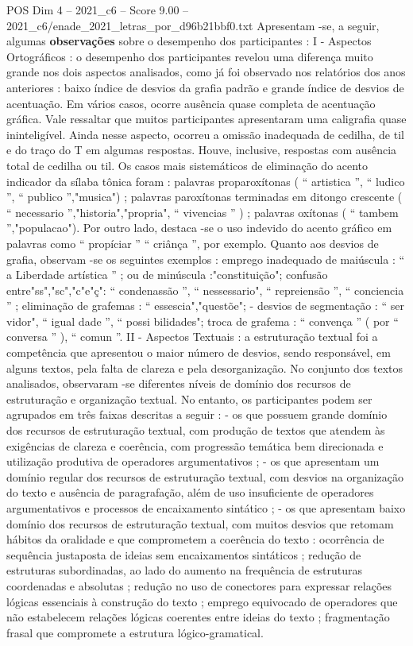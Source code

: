 \begin{textsample}{POS Dim 4 – 2021\_c6 – Score 9.00 – 2021\_c6/enade\_2021\_letras\_por\_d96b21bbf0.txt}
Apresentam -se, a seguir, algumas \textbf{observações} sobre o desempenho dos participantes : I - Aspectos Ortográficos : o desempenho dos participantes revelou uma diferença muito grande nos dois aspectos analisados, como já foi observado nos relatórios dos anos anteriores : baixo índice de desvios da grafia padrão e grande índice de desvios de acentuação.
Em vários casos, ocorre ausência quase completa de acentuação gráfica.
Vale ressaltar que muitos participantes apresentaram uma caligrafia quase ininteligível.
Ainda nesse aspecto, ocorreu a omissão inadequada de cedilha, de til e do traço do T em algumas respostas.
Houve, inclusive, respostas com ausência total de cedilha ou til.
Os casos mais sistemáticos de eliminação do acento indicador da sílaba tônica foram : palavras proparoxítonas ( “ artistica ”, “ ludico ”, “ publico ”,"musica") ; palavras paroxítonas terminadas em ditongo crescente ( “ necessario ”,"historia","propria", “ vivencias ” ) ; palavras oxítonas ( “ tambem ”,"populacao").
Por outro lado, destaca -se o uso indevido do acento gráfico em palavras como “ propíciar ” “ criânça ”, por exemplo.
Quanto aos desvios de grafia, observam -se os seguintes exemplos : emprego inadequado de maiúscula : “ a Liberdade artística ” ; ou de minúscula :"constituição"; confusão entre"ss","sc","c"e"ç": “ condenassão ”, “ nessessario", “ repreiensão ”, “ conciencia ” ; eliminação de grafemas : “ essescia","questõe"; - desvios de segmentação : “ ser vidor", “ igual dade ”, “ possi bilidades"; troca de grafema : “ convença ” ( por “ conversa ” ), “ comun ”.
II - Aspectos Textuais : a estruturação textual foi a competência que apresentou o maior número de desvios, sendo responsável, em alguns textos, pela falta de clareza e pela desorganização.
No conjunto dos textos analisados, observaram -se diferentes níveis de domínio dos recursos de estruturação e organização textual.
No entanto, os participantes podem ser agrupados em três faixas descritas a seguir : - os que possuem grande domínio dos recursos de estruturação textual, com produção de textos que atendem às exigências de clareza e coerência, com progressão temática bem direcionada e utilização produtiva de operadores argumentativos ; - os que apresentam um domínio regular dos recursos de estruturação textual, com desvios na organização do texto e ausência de paragrafação, além de uso insuficiente de operadores argumentativos e processos de encaixamento sintático ; - os que apresentam baixo domínio dos recursos de estruturação textual, com muitos desvios que retomam hábitos da oralidade e que comprometem a coerência do texto : ocorrência de sequência justaposta de ideias sem encaixamentos sintáticos ; redução de estruturas subordinadas, ao lado do aumento na frequência de estruturas coordenadas e absolutas ; redução no uso de conectores para expressar relações lógicas essenciais à construção do texto ; emprego equivocado de operadores que não estabelecem relações lógicas coerentes entre ideias do texto ; fragmentação frasal que compromete a estrutura lógico-gramatical.

\end{textsample}
